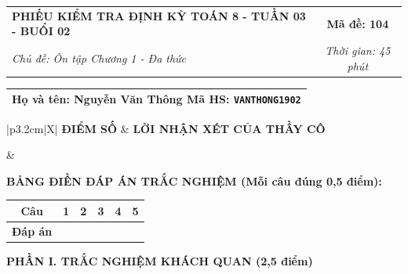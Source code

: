 \documentclass[12pt,a4paper]{article}
\begin{document}
\newpage


\noindent
\begin{tabularx}{\linewidth}{|X|c|}
\hline
\textbf{PHIẾU KIỂM TRA ĐỊNH KỲ TOÁN 8 - TUẦN 03 - BUỔI 02} & \textbf{Mã đề: 104} \\
\textit{Chủ đề: Ôn tập Chương 1 - Đa thức} & \textit{Thời gian: 45 phút} \\
\hline
\end{tabularx}

\vspace{1mm}

\noindent
\begin{tabularx}{\linewidth}{|X|}
\hline
\rule[-2mm]{0pt}{7.5mm}\textbf{Họ và tên:} \textbf{\large Nguyễn Văn Thông} \hfill \textbf{Mã HS:} \texttt{VANTHONG1902} \quad \\
\hline
\end{tabularx}

\vspace{1mm}

\noindent
\begin{tabularx}{\linewidth}{|p{3.2cm}|X|}
\hline
\centering\textbf{ĐIỂM SỐ} & \centering\textbf{LỜI NHẬN XÉT CỦA THẦY CÔ} \tabularnewline
\hline
\rule{0pt}{1.3cm} & \tabularnewline
\hline
\end{tabularx}

\vspace{1.2mm}

\noindent\textbf{BẢNG ĐIỀN ĐÁP ÁN TRẮC NGHIỆM (Mỗi câu đúng 0,5 điểm):}
\vspace{0.8mm}

\noindent
\renewcommand{\arraystretch}{1.35}
\begin{tabularx}{\linewidth}{|c|*{5}{>{\centering\arraybackslash}X|}}
\hline
\textbf{Câu} & \textbf{1} & \textbf{2} & \textbf{3} & \textbf{4} & \textbf{5} \\
\hline
\textbf{Đáp án} & & & & & \\
\hline
\end{tabularx}
\renewcommand{\arraystretch}{1.0}

\vspace{1.5mm}

\noindent\textbf{\large PHẦN I. TRẮC NGHIỆM KHÁCH QUAN (2,5 điểm)}
\vspace{1mm}
\end{document}
